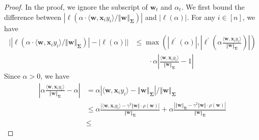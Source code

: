 \documentclass[pdflatex,sn-basic]{sn-jnl}%
\theoremstyle{thmstyleone}%
\begin{document}
\begin{appendices}
\begin{proof}
  In the proof, we ignore the subscript of $\mathbf{w}_t$ and $\alpha_t$. 
  We first bound the difference between
  $\left|  \ell \left(
      \alpha \cdot
      \langle \mathbf{w}, \mathbf{x}_i y_i \rangle / \left\Vert \mathbf{w} \right\Vert_{\mathbf{\Sigma}}
    \right)
  \right|$ 
  and $\left|\ell \left(\alpha\right)\right|$. For any $i \in [n]$, we have
  \begin{equation*}
  \begin{aligned}
    \Big|
      \left| 
      \ell
      \left(
        \alpha \cdot
        \langle \mathbf{w}, \mathbf{x}_i y_i \rangle / \left\Vert \mathbf{w} \right\Vert_{\mathbf{\Sigma}}
      \right)
      \right|
      - 
      \left|\ell \left(\alpha\right)\right|
    \Big|
    & \le 
    \max \left(
      \left|  \ell^{\prime} \left( \alpha \right) \right|,
      \left| \ell^{\prime} \left(
          \alpha \frac{\langle \mathbf{w}, \mathbf{x}_i y_i \rangle}
          {\left\Vert \mathbf{w} \right\Vert_{\mathbf{\Sigma}}} 
        \right)
      \right|
    \right)
    \\ & \qquad \cdot \alpha
    \left|
      \frac{\langle \mathbf{w}, \mathbf{x}_i y_i \rangle}{
        \left\Vert \mathbf{w} \right\Vert_{\mathbf{\Sigma}}
      }
      - 1
    \right|
  \end{aligned}
  \end{equation*}
  Since $\alpha > 0$, we have 
  \begin{equation}\label{eq:logit_margin_deviation_bound}
  \begin{aligned}
    \left| 
      \alpha
      \frac{\langle \mathbf{w}, \mathbf{x}_i y_i \rangle}{
        \left\Vert \mathbf{w} \right\Vert_{\mathbf{\Sigma}}
      }
      - 
      \alpha
    \right|
    & =
    \alpha
    \left| 
      \langle \mathbf{w}, \mathbf{x}_i y_i \rangle 
      - 
      \left\Vert \mathbf{w} \right\Vert_{\mathbf{\Sigma}}
    \right|
    / \left\Vert \mathbf{w} \right\Vert_{\mathbf{\Sigma}}
    \\ & \le
    \alpha\frac{
      \left| 
      \langle \mathbf{w}, \mathbf{x}_i y_i \rangle 
      - 
      \gamma^2 \Vert \mathbf{w} \Vert \cdot \rho \left(\mathbf{w}\right)
    \right|
    }{\left\Vert \mathbf{w} \right\Vert_{\mathbf{\Sigma}}}
    +
    \alpha\frac{
    \left| 
      \left\Vert \mathbf{w} \right\Vert_{\mathbf{\Sigma}}
      -
      \gamma^2 \Vert \mathbf{w} \Vert \cdot \rho \left(\mathbf{w}\right)
    \right|
    }{
      \left\Vert \mathbf{w} \right\Vert_{\mathbf{\Sigma}}
    }
    \\ & \le 

\end{aligned}
\end{equation}
\end{proof}
\end{appendices}
\end{document}
